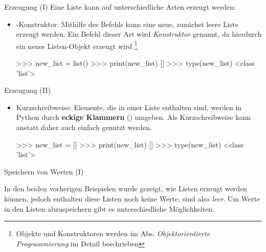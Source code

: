          \begin{frame}[fragile]{Erzeugung (I)}
            Eine Liste kann auf unterschiedliche Arten erzeugt werden:
            
            \begin{itemize}
                \item {}-Konstruktor: Mithilfe des Befehls  kann eine neue, zunächst leere Liste erzeugt werden. Ein Befehl dieser Art wird \textit{Konstruktor} genannt, da hierdurch ein neues Listen-Objekt erzeugt wird \footnote{Objekte und Konstruktoren werden im Abs. \textit{Objektorientierte Programmierung} im Detail beschrieben}
                
\begin{pyconcode}
>>> new_list = list()
>>> print(new_list)
[]
>>> type(new_list)
<class 'list'>
\end{pyconcode} 

            \end{itemize}
         \end{frame}
         
          \begin{frame}[fragile]{Erzeugung (II)}
            
            \begin{itemize}
                \item Kurzschreibweise: Elemente, die in einer Liste enthalten sind, werden in Python durch \textbf{eckige Klammern} (\code{[ ]}) umgeben. Als Kurzschreibweise kann anstatt  daher auch einfach \code{[]} genutzt werden.
   
\begin{pyconcode}
>>> new_list = []
>>> print(new_list)
[]
>>> type(new_list)
<class 'list'>
\end{pyconcode} 

            \end{itemize}
         \end{frame}
         
          \begin{frame}[fragile]{Speichern von Werten (I)}
            
            In den beiden vorherigen Beispielen wurde gezeigt, wie Listen erzeugt werden können, jedoch enthalten diese Listen noch keine Werte, sind also \textit{leer}. Um Werte in den Listen abzuspeichern gibt es unterschiedliche Möglichkeiten.
            
        \end{frame}
        
